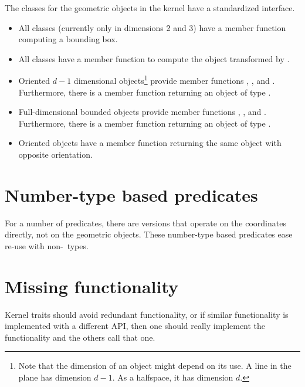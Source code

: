 The classes for the geometric objects in the kernel have a 
standardized interface.%
\begin{itemize}
\item
All classes (currently only in dimensions 2 and 3) have a  member function computing a bounding box.%
\item
All classes have a  member function
to compute the object transformed by .%
\item
Oriented $d-1$ dimensional objects\footnote{Note that the dimension
of an object might depend on its use. A line in the plane has dimension
$d-1$. As a halfspace, it has dimension $d$.} provide member functions
%
, %
, 
and %
. Furthermore, there is a member
function %
 returning an object of type
.
\item
Full-dimensional bounded objects provide member functions
%
, %
, 
and %
. Furthermore, there is a member
function %
 returning an object of type
.
\item
Oriented objects have a member function %
 returning
the same object with opposite orientation.
\end{itemize}


\section{Number-type based predicates}
For a number of predicates, there are versions that operate on
the coordinates directly, not on the geometric objects. These
number-type based predicates ease re-use with non-\cgal\ types.

\section{Missing functionality\label{sec:NewKernelTraits}}
Kernel traits should avoid 
redundant functionality, or if similar functionality is implemented
with a different API, then one should really implement the
functionality and the others call that one.


